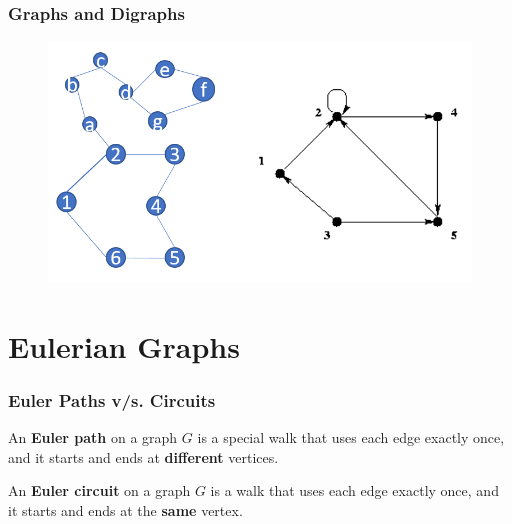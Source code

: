 \documentclass{beamer}
\begin{document}


\begin{frame}
\frametitle{Graphs and Digraphs}
\begin{figure}[h]
\includegraphics[width=\textwidth]{graphs.png}
\end{figure}
\end{frame}

\section{Eulerian Graphs}
\begin{frame}
\frametitle{Euler Paths v/s. Circuits}
\begin{definition}
 An \textbf{Euler path} on a graph $G$ is a special walk that uses each edge exactly once, and it starts and ends at \textbf{different} vertices.
\end{definition}
\begin{definition}
 An \textbf{Euler circuit} on a graph $G$ is a walk that uses each edge exactly once, and it starts and ends at the \textbf{same} vertex.
\end{definition}
\end{frame}

\end{document}
